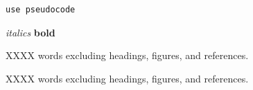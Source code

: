 \documentclass[11pt]{article} %
\begin{document}




\begin{verbatim}
use pseudocode
\end{verbatim}

\textit{italics}
\textbf{bold}

XXXX words excluding headings, figures, and references. \\

%
%
%




\medskip 

XXXX words excluding headings, figures, and references. \\
\pagebreak
\printbibliography
\end{document}
